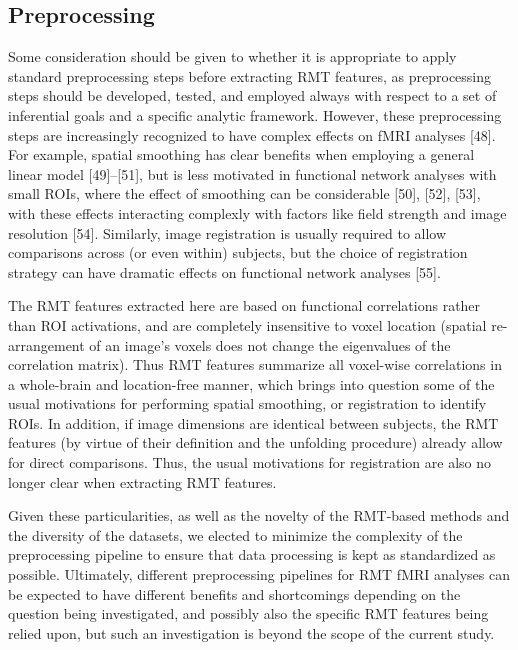 \subsection{Preprocessing}
Some consideration should be given to whether it is appropriate to apply standard preprocessing
steps before extracting RMT features, as preprocessing steps should be developed, tested, and
employed always with respect to a set of inferential goals and a specific analytic framework.
However, these preprocessing steps are increasingly recognized to have complex effects on fMRI
analyses [48]. For example, spatial smoothing has clear benefits when employing a general linear
model [49]–[51], but is less motivated in functional network analyses with small ROIs, where the
effect of smoothing can be considerable [50], [52], [53], with these effects interacting complexly
with factors like field strength and image resolution [54]. Similarly, image registration is usually
required to allow comparisons across (or even within) subjects, but the choice of registration
strategy can have dramatic effects on functional network analyses [55].

The RMT features extracted here are based on functional correlations rather than ROI activations,
and are completely insensitive to voxel location (spatial re-arrangement of an image’s voxels does
not change the eigenvalues of the correlation matrix). Thus RMT features summarize all voxel-wise
correlations in a whole-brain and location-free manner, which brings into question some of the usual
motivations for performing spatial smoothing, or registration to identify ROIs. In addition, if
image dimensions are identical between subjects, the RMT features (by virtue of their definition and
the unfolding procedure) already allow for direct comparisons. Thus, the usual motivations for
registration are also no longer clear when extracting RMT features.

Given these particularities, as well as the novelty of the RMT-based methods and the diversity of
the datasets, we elected to minimize the complexity of the preprocessing pipeline to ensure that
data processing is kept as standardized as possible. Ultimately, different preprocessing pipelines
for RMT fMRI analyses can be expected to have different benefits and shortcomings depending on the
question being investigated, and possibly also the specific RMT features being relied upon, but such
an investigation is beyond the scope of the current study.

